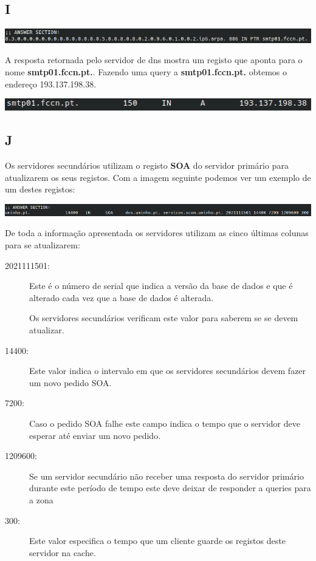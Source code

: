 \documentclass{report}
\begin{document}
        \subsection*{I}
            \noindent
            \includegraphics[width=\textwidth]{images/dig_ipv6.png}
            \par
            A resposta retornada pelo servidor de dns mostra um registo que aponta para o nome \textbf{smtp01.fccn.pt.}.
            Fazendo uma query a \textbf{smtp01.fccn.pt.} obtemos o endereço 193.137.198.38.
            \par
            \noindent
            \includegraphics[width=\textwidth]{images/dig_smtp01.png}
            \par
        \subsection*{J}
            Os servidores secundários utilizam o registo \textbf{SOA} do servidor primário para atualizarem os seus registos. 
            Com a imagem seguinte podemos ver um exemplo de um destes registos: 
            \vspace{0.45em}
            \par
            \noindent
            \includegraphics[width=\textwidth]{images/uminho_soa.png}
            \par
            \vspace{0.45em}
            De toda a informação apresentada os servidores utilizam as cinco últimas colunas para se atualizarem:
            \begin{description}
                \item[2021111501:] Este é o número de serial que indica a versão da base de dados e que é alterado cada vez que a base de dados é alterada. 
                \par Os servidores secundários verificam este valor para saberem se se devem atualizar.
                \item[14400:] Este valor indica o intervalo em que os servidores secundários devem fazer um novo pedido SOA.
                \item[7200:] Caso o pedido SOA falhe este campo indica o tempo que o servidor deve esperar até enviar um novo pedido.
                \item[1209600:] Se um servidor secundário não receber uma resposta do servidor primário durante este período de tempo este deve deixar de responder a queries para a zona
                \item[300:] Este valor especifica o tempo que um cliente guarde os registos deste servidor na cache. 
            \end{description}
\end{document}
